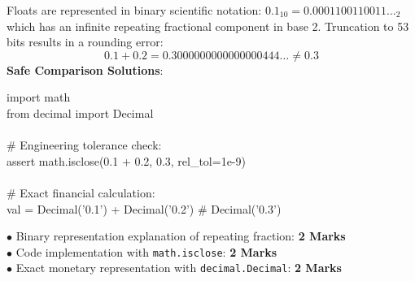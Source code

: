 \begin{solutionbox}
Floats are represented in binary scientific notation: $0.1_{10} = 0.0001100110011\dots_2$ which has an infinite repeating fractional component in base 2. Truncation to 53 bits results in a rounding error:
\begin{equation*}
0.1 + 0.2 = 0.3000000000000000444 \dots \neq 0.3
\end{equation*}
\textbf{Safe Comparison Solutions}:
\begin{pycode}
import math\\
from decimal import Decimal\\
~\\
\# Engineering tolerance check:\\
assert math.isclose(0.1 + 0.2, 0.3, rel\_tol=1e-9)\\
~\\
\# Exact financial calculation:\\
val = Decimal('0.1') + Decimal('0.2')  \# Decimal('0.3')
\end{pycode}
\begin{markingrubric}
$\bullet$ Binary representation explanation of repeating fraction: \textbf{2 Marks}\\
$\bullet$ Code implementation with \texttt{math.isclose}: \textbf{2 Marks}\\
$\bullet$ Exact monetary representation with \texttt{decimal.Decimal}: \textbf{2 Marks}
\end{markingrubric}
\end{solutionbox}

